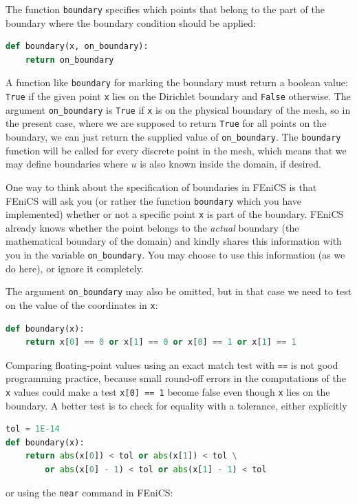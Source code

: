 \documentclass[graybox,envcountchap,sectrefs,final]{svmonodo}
\begin{document}

The function \texttt{boundary} specifies which points that belong to the
part of the boundary where the boundary condition should be applied:

\begin{lstlisting}[language=Python,style=graycolor]
def boundary(x, on_boundary):
    return on_boundary
\end{lstlisting}
A function like \texttt{boundary} for marking the boundary must return a
boolean value: \texttt{True} if the given point \texttt{x} lies on the Dirichlet
boundary and \texttt{False} otherwise.  The argument \Verb!on_boundary! is \texttt{True}
if \texttt{x} is on the physical boundary of the mesh, so in the present
case, where we are supposed to return \texttt{True} for all points on the
boundary, we can just return the supplied value of \Verb!on_boundary!. The
\texttt{boundary} function will be called for every discrete point in the
mesh, which means that we may define boundaries where $u$ is also
known inside the domain, if desired.

One way to think about the specification of boundaries in FEniCS is
that FEniCS will ask you (or rather the function \texttt{boundary} which
you have implemented) whether or not a specific point \texttt{x} is part of
the boundary. FEniCS already knows whether the point belongs to the
\emph{actual} boundary (the mathematical boundary of the domain) and kindly
shares this information with you in the variable \Verb!on_boundary!. You
may choose to use this information (as we do here), or ignore it
completely.

The argument \Verb!on_boundary! may also be omitted, but in that case we need
to test on the value of the coordinates in \texttt{x}:

\begin{lstlisting}[language=Python,style=graycolor]
def boundary(x):
    return x[0] == 0 or x[1] == 0 or x[0] == 1 or x[1] == 1
\end{lstlisting}
Comparing floating-point values using an exact match test with
\texttt{==} is not good programming practice, because small round-off errors
in the computations of the \texttt{x} values could make a test \texttt{x[0] == 1}
become false even though \texttt{x} lies on the boundary.  A better test is
to check for equality with a tolerance, either explicitly

\begin{lstlisting}[language=Python,style=graycolor]
tol = 1E-14
def boundary(x):
    return abs(x[0]) < tol or abs(x[1]) < tol \
        or abs(x[0] - 1) < tol or abs(x[1] - 1) < tol
\end{lstlisting}
or using the \texttt{near} command in FEniCS:
\end{document}

